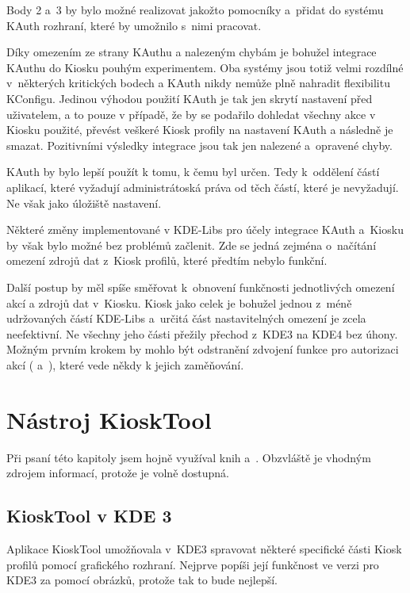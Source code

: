 Body 2 a~3 by bylo možné realizovat jakožto pomocníky a~přidat do systému KAuth rozhraní, které by umožnilo s~nimi pracovat.

Díky omezením ze strany KAuthu a nalezeným chybám je bohužel integrace KAuthu do Kiosku pouhým experimentem. Oba systémy jsou totiž velmi rozdílné v~některých kritických bodech a KAuth nikdy nemůže plně nahradit flexibilitu KConfigu. Jedinou výhodou použití KAuth je tak jen skrytí nastavení před uživatelem, a to pouze v případě, že by se podařilo dohledat všechny akce v Kiosku použité, převést veškeré Kiosk profily na nastavení KAuth a následně je smazat. Pozitivními výsledky integrace jsou tak jen nalezené a~opravené chyby.

KAuth by bylo lepší použít k tomu, k čemu byl určen. Tedy k~oddělení částí aplikací, které vyžadují administrátoská práva od těch částí, které je nevyžadují. Ne však jako úložiště nastavení.

Některé změny implementované v KDE-Libs pro účely integrace KAuth a~Kiosku by však bylo možné bez problémů začlenit. Zde se jedná zejména o~načítání omezení zdrojů dat z~Kiosk profilů, které předtím nebylo funkční.

Další postup by měl spíše směřovat k~obnovení funkčnosti jednotlivých omezení akcí a zdrojů dat v~Kiosku. Kiosk jako celek je bohužel jednou z~méně udržovaných částí KDE-Libs a~určitá část nastavitelných omezení je zcela neefektivní. Ne všechny jeho části přežily přechod z~KDE3 na KDE4 bez úhony. Možným prvním krokem by mohlo být odstranění zdvojení funkce pro autorizaci akcí ( a~), které vede někdy k jejich zaměňování.

\chapter{Nástroj KioskTool}
Při psaní této kapitoly jsem hojně využíval knih \cite{StarchQt4} a~\cite{Ezust}. Obzvláště \cite{Ezust} je vhodným zdrojem informací, protože je volně dostupná.

\section{KioskTool v KDE 3}
Aplikace KioskTool umožňovala v~KDE3 spravovat některé specifické části Kiosk profilů pomocí grafického rozhraní. Nejprve popíši její funkčnost ve verzi pro KDE3 za pomocí obrázků, protože tak to bude nejlepší.

